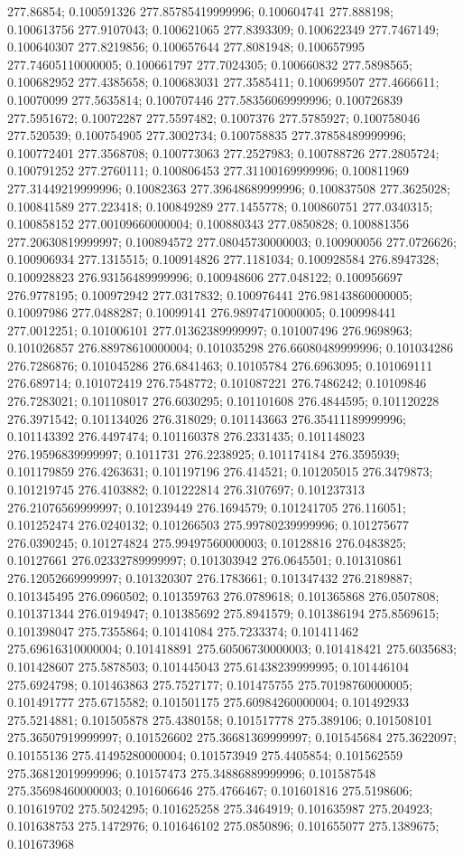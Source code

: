 277.86854; 0.100591326 277.85785419999996; 0.100604741 277.888198; 0.100613756 277.9107043; 0.100621065 277.8393309; 0.100622349 277.7467149; 0.100640307 277.8219856; 0.100657644 277.8081948; 0.100657995 277.74605110000005; 0.100661797 277.7024305; 0.100660832 277.5898565; 0.100682952 277.4385658; 0.100683031 277.3585411; 0.100699507 277.4666611; 0.10070099 277.5635814; 0.100707446 277.58356069999996; 0.100726839 277.5951672; 0.10072287 277.5597482; 0.1007376 277.5785927; 0.100758046 277.520539; 0.100754905 277.3002734; 0.100758835 277.37858489999996; 0.100772401 277.3568708; 0.100773063 277.2527983; 0.100788726 277.2805724; 0.100791252 277.2760111; 0.100806453 277.31100169999996; 0.100811969 277.31449219999996; 0.10082363 277.39648689999996; 0.100837508 277.3625028; 0.100841589 277.223418; 0.100849289 277.1455778; 0.100860751 277.0340315; 0.100858152 277.00109660000004; 0.100880343 277.0850828; 0.100881356 277.20630819999997; 0.100894572 277.08045730000003; 0.100900056 277.0726626; 0.100906934 277.1315515; 0.100914826 277.1181034; 0.100928584 276.8947328; 0.100928823 276.93156489999996; 0.100948606 277.048122; 0.100956697 276.9778195; 0.100972942 277.0317832; 0.100976441 276.98143860000005; 0.10097986 277.0488287; 0.10099141 276.98974710000005; 0.100998441 277.0012251; 0.101006101 277.01362389999997; 0.101007496 276.9698963; 0.101026857 276.88978610000004; 0.101035298 276.66080489999996; 0.101034286 276.7286876; 0.101045286 276.6841463; 0.10105784 276.6963095; 0.101069111 276.689714; 0.101072419 276.7548772; 0.101087221 276.7486242; 0.10109846 276.7283021; 0.101108017 276.6030295; 0.101101608 276.4844595; 0.101120228 276.3971542; 0.101134026 276.318029; 0.101143663 276.35411189999996; 0.101143392 276.4497474; 0.101160378 276.2331435; 0.101148023 276.19596839999997; 0.1011731 276.2238925; 0.101174184 276.3595939; 0.101179859 276.4263631; 0.101197196 276.414521; 0.101205015 276.3479873; 0.101219745 276.4103882; 0.101222814 276.3107697; 0.101237313 276.21076569999997; 0.101239449 276.1694579; 0.101241705 276.116051; 0.101252474 276.0240132; 0.101266503 275.99780239999996; 0.101275677 276.0390245; 0.101274824 275.99497560000003; 0.10128816 276.0483825; 0.10127661 276.02332789999997; 0.101303942 276.0645501; 0.101310861 276.12052669999997; 0.101320307 276.1783661; 0.101347432 276.2189887; 0.101345495 276.0960502; 0.101359763 276.0789618; 0.101365868 276.0507808; 0.101371344 276.0194947; 0.101385692 275.8941579; 0.101386194 275.8569615; 0.101398047 275.7355864; 0.10141084 275.7233374; 0.101411462 275.69616310000004; 0.101418891 275.60506730000003; 0.101418421 275.6035683; 0.101428607 275.5878503; 0.101445043 275.61438239999995; 0.101446104 275.6924798; 0.101463863 275.7527177; 0.101475755 275.70198760000005; 0.101491777 275.6715582; 0.101501175 275.60984260000004; 0.101492933 275.5214881; 0.101505878 275.4380158; 0.101517778 275.389106; 0.101508101 275.36507919999997; 0.101526602 275.36681369999997; 0.101545684 275.3622097; 0.10155136 275.41495280000004; 0.101573949 275.4405854; 0.101562559 275.36812019999996; 0.10157473 275.34886889999996; 0.101587548 275.35698460000003; 0.101606646 275.4766467; 0.101601816 275.5198606; 0.101619702 275.5024295; 0.101625258 275.3464919; 0.101635987 275.204923; 0.101638753 275.1472976; 0.101646102 275.0850896; 0.101655077 275.1389675; 0.101673968 
